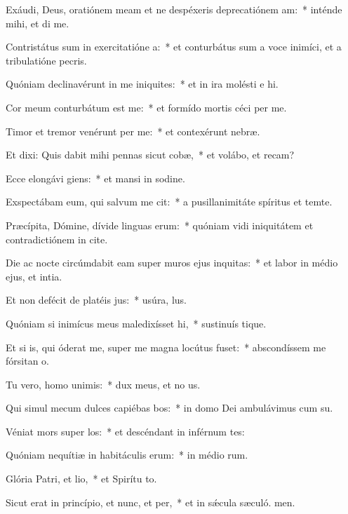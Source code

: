 \item Exáudi, Deus, oratiónem meam et ne despéxeris deprecatiónem am:~* inténde mihi, et di me.
\item Contristátus sum in exercitatióne a:~* et conturbátus sum a voce inimíci, et a tribulatióne pecris.
\item Quóniam declinavérunt in me iniquites:~* et in ira molésti e hi.
\item Cor meum conturbátum est  me:~* et formído mortis céci per me.
\item Timor et tremor venérunt per me:~* et contexérunt  nebræ.
\item Et dixi: Quis dabit mihi pennas sicut cobæ,~* et volábo, et recam?
\item Ecce elongávi giens:~* et mansi in sodine.
\item Exspectábam eum, qui salvum me cit:~* a pusillanimitáte spíritus et temte.
\item Præcípita, Dómine, dívide linguas erum:~* quóniam vidi iniquitátem et contradictiónem in cite.
\item Die ac nocte circúmdabit eam super muros ejus inquitas:~* et labor in médio ejus, et intia.
\item Et non defécit de platéis jus:~* usúra,  lus.
\item Quóniam si inimícus meus maledixísset hi,~* sustinuís tique.
\item Et si is, qui óderat me, super me magna locútus fuset:~* abscondíssem me fórsitan  o.
\item Tu vero, homo unimis:~* dux meus, et no us.
\item Qui simul mecum dulces capiébas bos:~* in domo Dei ambulávimus cum su.
\item Véniat mors super los:~* et descéndant in inférnum tes:
\item Quóniam nequítiæ in habitáculis erum:~* in médio rum.
\item Glória Patri, et lio,~* et Spirítu to.
\item Sicut erat in princípio, et nunc, et per,~* et in sǽcula sæculó. men.
